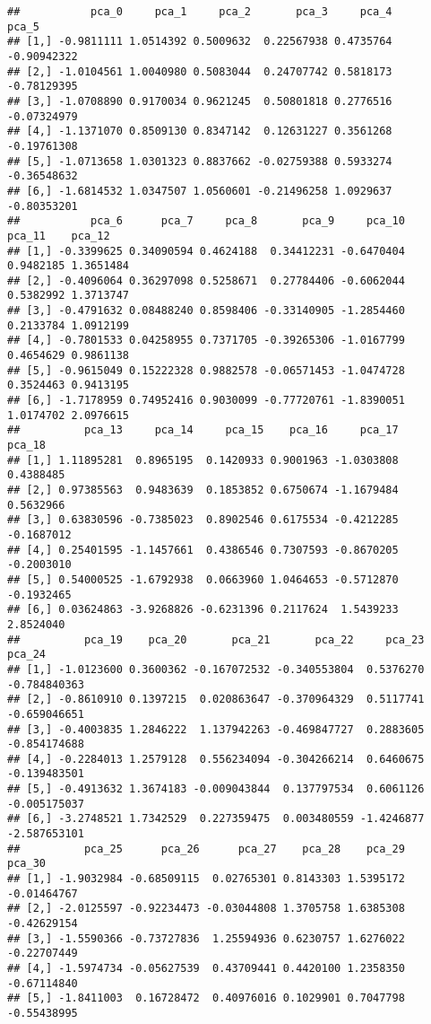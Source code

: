 \documentclass[
]{article}
\begin{document}
\begin{verbatim}
##           pca_0     pca_1     pca_2       pca_3     pca_4       pca_5
## [1,] -0.9811111 1.0514392 0.5009632  0.22567938 0.4735764 -0.90942322
## [2,] -1.0104561 1.0040980 0.5083044  0.24707742 0.5818173 -0.78129395
## [3,] -1.0708890 0.9170034 0.9621245  0.50801818 0.2776516 -0.07324979
## [4,] -1.1371070 0.8509130 0.8347142  0.12631227 0.3561268 -0.19761308
## [5,] -1.0713658 1.0301323 0.8837662 -0.02759388 0.5933274 -0.36548632
## [6,] -1.6814532 1.0347507 1.0560601 -0.21496258 1.0929637 -0.80353201
##           pca_6      pca_7     pca_8       pca_9     pca_10    pca_11    pca_12
## [1,] -0.3399625 0.34090594 0.4624188  0.34412231 -0.6470404 0.9482185 1.3651484
## [2,] -0.4096064 0.36297098 0.5258671  0.27784406 -0.6062044 0.5382992 1.3713747
## [3,] -0.4791632 0.08488240 0.8598406 -0.33140905 -1.2854460 0.2133784 1.0912199
## [4,] -0.7801533 0.04258955 0.7371705 -0.39265306 -1.0167799 0.4654629 0.9861138
## [5,] -0.9615049 0.15222328 0.9882578 -0.06571453 -1.0474728 0.3524463 0.9413195
## [6,] -1.7178959 0.74952416 0.9030099 -0.77720761 -1.8390051 1.0174702 2.0976615
##          pca_13     pca_14     pca_15    pca_16     pca_17     pca_18
## [1,] 1.11895281  0.8965195  0.1420933 0.9001963 -1.0303808  0.4388485
## [2,] 0.97385563  0.9483639  0.1853852 0.6750674 -1.1679484  0.5632966
## [3,] 0.63830596 -0.7385023  0.8902546 0.6175534 -0.4212285 -0.1687012
## [4,] 0.25401595 -1.1457661  0.4386546 0.7307593 -0.8670205 -0.2003010
## [5,] 0.54000525 -1.6792938  0.0663960 1.0464653 -0.5712870 -0.1932465
## [6,] 0.03624863 -3.9268826 -0.6231396 0.2117624  1.5439233  2.8524040
##          pca_19    pca_20       pca_21       pca_22     pca_23       pca_24
## [1,] -1.0123600 0.3600362 -0.167072532 -0.340553804  0.5376270 -0.784840363
## [2,] -0.8610910 0.1397215  0.020863647 -0.370964329  0.5117741 -0.659046651
## [3,] -0.4003835 1.2846222  1.137942263 -0.469847727  0.2883605 -0.854174688
## [4,] -0.2284013 1.2579128  0.556234094 -0.304266214  0.6460675 -0.139483501
## [5,] -0.4913632 1.3674183 -0.009043844  0.137797534  0.6061126 -0.005175037
## [6,] -3.2748521 1.7342529  0.227359475  0.003480559 -1.4246877 -2.587653101
##          pca_25      pca_26      pca_27    pca_28    pca_29      pca_30
## [1,] -1.9032984 -0.68509115  0.02765301 0.8143303 1.5395172 -0.01464767
## [2,] -2.0125597 -0.92234473 -0.03044808 1.3705758 1.6385308 -0.42629154
## [3,] -1.5590366 -0.73727836  1.25594936 0.6230757 1.6276022 -0.22707449
## [4,] -1.5974734 -0.05627539  0.43709441 0.4420100 1.2358350 -0.67114840
## [5,] -1.8411003  0.16728472  0.40976016 0.1029901 0.7047798 -0.55438995

\end{verbatim}
\end{document}
